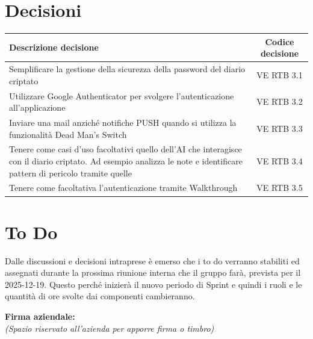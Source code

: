 \documentclass[a4paper,12pt]{article}
\newcommand{\ignoreglossary}{}
\begin{document}
\section{Decisioni}
\begin{center}
\small
\renewcommand{\arraystretch}{1.2} 
\begin{tabular}{|p{}|c|}
\hline
\rowcolor{gray!60} 
\textbf{Descrizione decisione} & \textbf{Codice decisione} \\
\hline
\rowcolor{white}
Semplificare la gestione della sicurezza della password del diario criptato & VE \ignoreglossary{RTB} 3.1 \\
\hline
\rowcolor{gray!20}
Utilizzare Google Authenticator per svolgere l'autenticazione all'applicazione &  VE \ignoreglossary{RTB} 3.2 \\
\hline
\rowcolor{white}
Inviare una mail anziché notifiche PUSH quando si utilizza la funzionalità Dead Man's Switch &  VE \ignoreglossary{RTB} 3.3\\
\hline
\rowcolor{gray!20}
Tenere come casi d'uso facoltativi quello dell'AI che interagisce con il diario criptato. Ad esempio analizza le note e identificare pattern di pericolo tramite quelle &  VE \ignoreglossary{RTB} 3.4\\
\hline
\rowcolor{white}
Tenere come facoltativa l'autenticazione tramite Walkthrough &  VE \ignoreglossary{RTB} 3.5\\
\hline
\end{tabular}
\end{center}

\section{To Do}
Dalle discussioni e decisioni intraprese è emerso che i to do verranno stabiliti ed assegnati durante la prossima riunione interna che il gruppo farà, prevista per il 2025-12-19. Questo perché inizierà il nuovo periodo di Sprint e quindi i ruoli e le quantità di ore svolte dai componenti cambieranno. 

\vspace*{\fill} %
\noindent
\begin{minipage}{0.60\textwidth}
    {\small
    \textbf{Firma aziendale:}\\[0.3cm]
    \textit{(Spazio riservato all’azienda per apporre firma o timbro)}\\[0.8cm]
    \fbox{\rule{0pt}{2.5cm}\rule{5cm}{0pt}} %
    }
\end{minipage}
\end{document}
